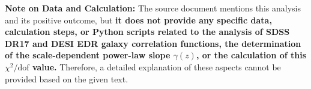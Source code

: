 \documentclass{article}
\begin{document}
\textbf{Note on Data and Calculation:}
The source document mentions this analysis and its positive outcome, but \textbf{it does not provide any specific data, calculation steps, or Python scripts related to the analysis of SDSS DR17 and DESI EDR galaxy correlation functions, the determination of the scale-dependent power-law slope $\gamma(z)$, or the calculation of this $\chi^2/\text{dof}$ value.} Therefore, a detailed explanation of these aspects cannot be provided based on the given text.
\end{document}
